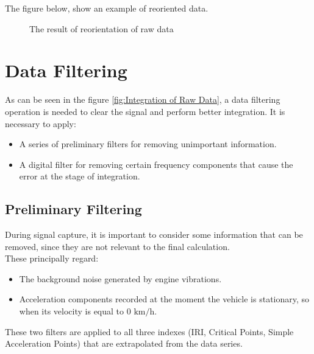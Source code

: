 \documentclass[tesi]{subfiles}
\begin{document}
\noindent The figure below, show an example of reoriented data.
\begin{figure}[ht]
  \centering
  

 
  \caption{The result of reorientation of raw data}
  \label{fig:Accelerometer Reoriented}
\end{figure}

\section{Data Filtering} \label{sc:Data Filtering}
As can be seen in the figure \ref{fig:Integration of Raw Data}, a data filtering operation is needed to clear the signal and perform better integration.
It is necessary to apply:

\begin{itemize}
\item A series of preliminary filters for removing unimportant information.
\item A digital filter for removing certain frequency components that cause the error at the stage of integration.
\end{itemize}



\subsection{Preliminary Filtering}\label{ssc:Preliminary Filtering}
During signal capture, it is important to consider some information that can be removed, since they are not relevant to the final calculation.\\
These principally regard:
\begin{itemize}
\item The background noise generated by engine vibrations.
\item Acceleration components recorded at the moment the vehicle is stationary, so when its velocity is equal to $0$ $\si{\km\per\hour}$.
\end{itemize}

\noindent These two filters are applied to all three indexes (IRI, Critical Points, Simple Acceleration Points) that are extrapolated from the data series.
\end{document}
